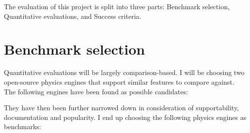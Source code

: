 \documentclass[12pt,a4paper,twoside,openright]{report}
\begin{document}
The evaluation of this project is split into three parts: Benchmark selection, Quantitative evaluations, and Success criteria.

\section{Benchmark selection}

Quantitative evaluations will be largely comparison-based. 
I will be choosing two open-source physics engines that support similar features to compare against.
The following engines have been found as possible candidates:

\begin{table}[h]
  \centering
\end{table}

They have then been further narrowed down in consideration of supportability, documentation and popularity. I end up choosing the following physics engines as benchmarks:
\end{document}
